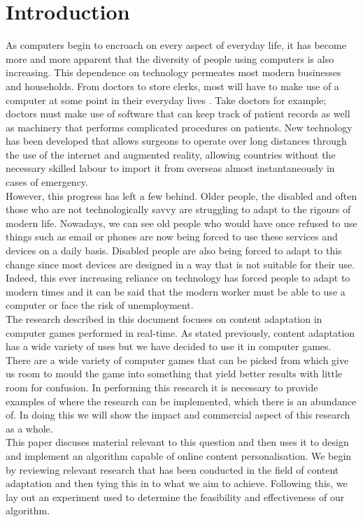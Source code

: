 \documentclass[11pt, conference, compsoc]{IEEEtran}
\begin{document}
\section{Introduction}
As computers begin to encroach on every aspect of everyday life, it has become more and more apparent that the diversity of people using computers is also increasing. This dependence on technology permeates most modern businesses and households. From doctors to store clerks, most will have to make use of a computer at some point in their everyday lives \cite{beaudry2005understanding}. Take doctors for example; doctors must make use of software that can keep track of patient records as well as machinery that performs complicated procedures on patients. New technology has been developed that allows surgeons to operate over long distances through the use of the internet and augmented reality, allowing countries without the necessary skilled labour to import it from overseas almost instantaneously in cases of emergency.\\
However, this progress has left a few behind. Older people, the disabled and often those who are not technologically savvy are struggling to adapt to the rigours of modern life.\cite{gajos2008improving}  Nowadays, we can see old people who would have once refused to use things such as email or phones are now being forced to use these services and devices on a daily basis. Disabled people  are also being forced to adapt to this change since most devices are designed in a way that is not suitable for their use\cite{gajos2008improving}. Indeed, this ever increasing reliance on technology has forced people to adapt to modern times and it can be said that the modern worker must be able to use a computer or face the risk of unemployment.\\
The research described in this document focuses on content adaptation in computer games performed in real-time. As stated previously, content adaptation has a wide variety of uses but we have decided to use it in computer games. There are a wide variety of computer games that can be picked from which give us room to mould the game into something that yield better results with little room for confusion. In performing this research it is necessary to provide examples of where the research can be implemented, which there is an abundance of. In doing this we will show the impact and commercial aspect of this research as a whole.\\
This paper discuses material relevant to this question and then uses it to design and implement an algorithm capable of online content personalisation. We begin by reviewing relevant research that has been conducted in the field of content adaptation and then tying this in to what we aim to achieve. Following this, we lay out an experiment used to determine the feasibility and effectiveness of our algorithm.
\end{document}
